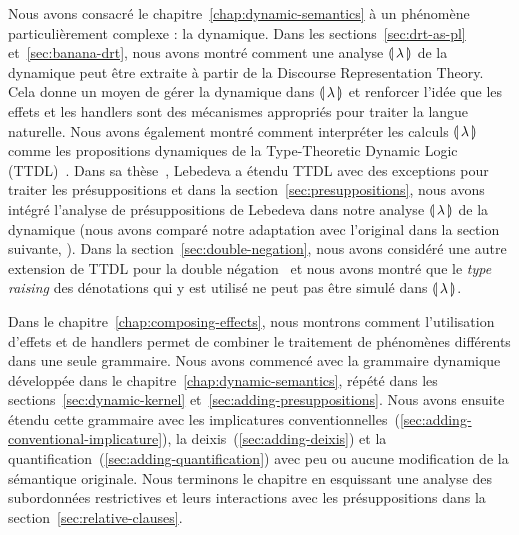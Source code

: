 Nous avons consacré le chapitre~\ref{chap:dynamic-semantics} à un phénomène
particulièrement complexe : la dynamique. Dans les sections~\ref{sec:drt-as-pl}
et~\ref{sec:banana-drt}, nous avons montré comment une analyse ${\llparenthesis \, \lambda \, \rrparenthesis}$ de la
dynamique peut être extraite à partir de la Discourse Representation Theory. Cela 
donne un moyen de gérer la dynamique dans ${\llparenthesis \, \lambda \, \rrparenthesis}$ et renforcer l'idée
que les effets et les handlers sont des mécanismes appropriés pour
traiter la langue naturelle. Nous avons également montré comment interpréter les
calculs ${\llparenthesis \, \lambda \, \rrparenthesis}$ comme les propositions dynamiques de la Type-Theoretic Dynamic
Logic (TTDL)~\cite{de2006towards}. Dans sa thèse~\cite{lebedeva2012expression},
Lebedeva a étendu TTDL avec des exceptions pour traiter les présuppositions
et dans la section~\ref{sec:presuppositions}, nous avons intégré l'analyse de
présuppositions de Lebedeva dans notre analyse ${\llparenthesis \, \lambda \, \rrparenthesis}$ de la dynamique (nous
avons comparé notre adaptation avec l'original dans la section suivante,
). Dans la section~\ref{sec:double-negation}, nous avons
considéré une autre extension de TTDL pour la double négation~\cite{qian2014accessibility} et nous avons montré que le \textit{type raising} des dénotations qui y est utilisé ne peut pas être simulé dans ${\llparenthesis \, \lambda \, \rrparenthesis}$.

Dans le chapitre~\ref{chap:composing-effects}, nous montrons comment l'utilisation d'effets et de handlers permet de
combiner le traitement de phénomènes différents dans une seule grammaire. Nous avons commencé
avec la grammaire dynamique développée dans le
chapitre~\ref{chap:dynamic-semantics}, répété dans les
sections~\ref{sec:dynamic-kernel} et~\ref{sec:adding-presuppositions}. Nous
avons ensuite étendu cette grammaire avec les implicatures
conventionnelles~(\ref{sec:adding-conventional-implicature}), la
deixis~(\ref{sec:adding-deixis}) et la
quantification~(\ref{sec:adding-quantification}) avec peu ou aucune modification
de la sémantique originale. Nous terminons le chapitre en esquissant une
analyse des subordonnées restrictives et leurs interactions avec les
présuppositions dans la section~\ref{sec:relative-clauses}.